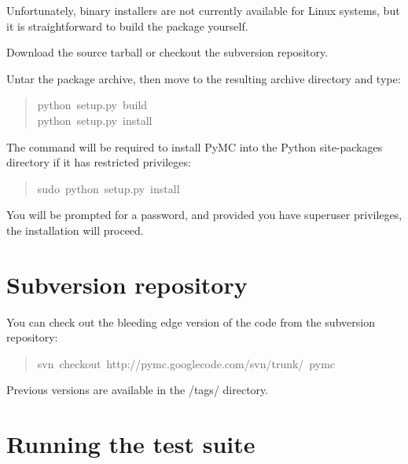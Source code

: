 Unfortunately, binary installers are not currently available for Linux systems, 
but it is straightforward to build the package yourself.
\begin{list}{.}
{
\setlength{\rightmargin}{\leftmargin}
}
\item {} 
Download the source tarball or checkout the subversion repository.

\item {} 
Untar the package archive, then move to the resulting archive directory and type:
\begin{quote}{\ttfamily \raggedright \noindent
python~setup.py~build~\\
python~setup.py~install
}\end{quote}

\end{list}

The  command will be required to install PyMC into the Python site-packages 
directory if it has restricted privileges:
\begin{quote}{\ttfamily \raggedright \noindent
sudo~python~setup.py~install
}\end{quote}

You will be prompted for a  password, and provided you have superuser privileges, 
the installation will proceed.



\hypertarget{subversion-repository}{}
\section*{Subversion repository}

You can check out the bleeding edge version of the code from the subversion 
repository:
\begin{quote}{\ttfamily \raggedright \noindent
svn~checkout~http://pymc.googlecode.com/svn/trunk/~pymc
}\end{quote}

Previous versions are available in the /tags/ directory.



\hypertarget{running-the-test-suite}{}
\section*{Running the test suite}

